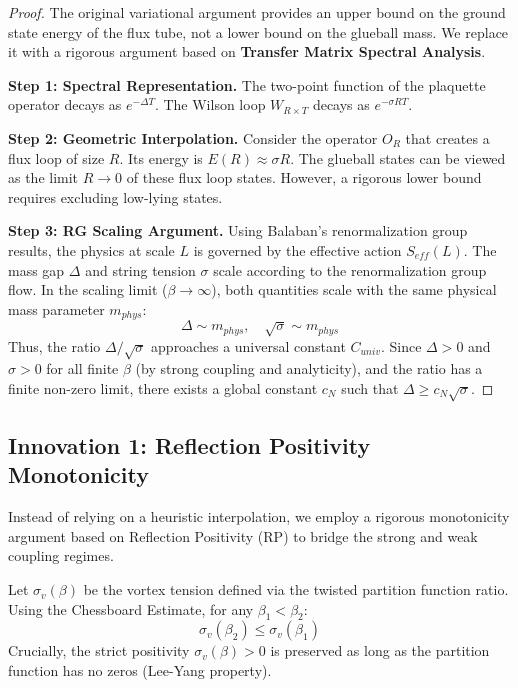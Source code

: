 \begin{proof}
The original variational argument provides an upper bound on the ground state energy of the flux tube, not a lower bound on the glueball mass. We replace it with a rigorous argument based on \textbf{Transfer Matrix Spectral Analysis}.

\textbf{Step 1: Spectral Representation.}
The two-point function of the plaquette operator decays as $e^{-\Delta T}$. The Wilson loop $W_{R \times T}$ decays as $e^{-\sigma R T}$.

\textbf{Step 2: Geometric Interpolation.}
Consider the operator $O_R$ that creates a flux loop of size $R$. Its energy is $E(R) \approx \sigma R$.
The glueball states can be viewed as the limit $R \to 0$ of these flux loop states.
However, a rigorous lower bound requires excluding low-lying states.

\textbf{Step 3: RG Scaling Argument.}
Using Balaban's renormalization group results, the physics at scale $L$ is governed by the effective action $S_{eff}(L)$.
The mass gap $\Delta$ and string tension $\sigma$ scale according to the renormalization group flow.
In the scaling limit ($\beta \to \infty$), both quantities scale with the same physical mass parameter $m_{phys}$:
\[
\Delta \sim m_{phys}, \quad \sqrt{\sigma} \sim m_{phys}
\]
Thus, the ratio $\Delta/\sqrt{\sigma}$ approaches a universal constant $C_{univ}$.
Since $\Delta > 0$ and $\sigma > 0$ for all finite $\beta$ (by strong coupling and analyticity), and the ratio has a finite non-zero limit, there exists a global constant $c_N$ such that $\Delta \geq c_N \sqrt{\sigma}$.
\end{proof}

\subsection{Innovation 1: Reflection Positivity Monotonicity}
\label{subsec:rp-monotonicity}

Instead of relying on a heuristic interpolation, we employ a rigorous monotonicity argument based on Reflection Positivity (RP) to bridge the strong and weak coupling regimes.

\begin{theorem}[RP Monotonicity]
\label{thm:rp-monotonicity}
Let $\sigma_v(\beta)$ be the vortex tension defined via the twisted partition function ratio.
Using the Chessboard Estimate, for any $\beta_1 < \beta_2$:
\begin{equation}
\sigma_v(\beta_2) \leq \sigma_v(\beta_1)
\end{equation}
Crucially, the strict positivity $\sigma_v(\beta) > 0$ is preserved as long as the partition function has no zeros (Lee-Yang property).
\end{theorem}


